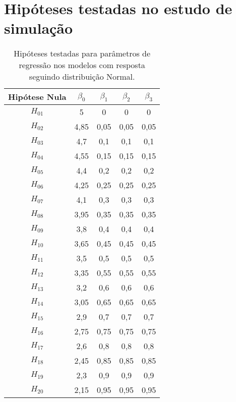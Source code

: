 \chapter{Hipóteses testadas no estudo de simulação}


\begin{table}[H]
\centering
\begin{tabular}{c|cccc}
\hline
Hipótese Nula & $\beta_0$ & $\beta_1$ & $\beta_2$ & $\beta_3$ \\ \hline
$H_{01}$      & 5         & 0         & 0         & 0         \\
$H_{02}$      & 4,85      & 0,05      & 0,05      & 0,05      \\
$H_{03}$      & 4,7       & 0,1       & 0,1       & 0,1       \\
$H_{04}$      & 4,55      & 0,15      & 0,15      & 0,15      \\
$H_{05}$      & 4,4       & 0,2       & 0,2       & 0,2       \\
$H_{06}$      & 4,25      & 0,25      & 0,25      & 0,25      \\
$H_{07}$      & 4,1       & 0,3       & 0,3       & 0,3       \\
$H_{08}$      & 3,95      & 0,35      & 0,35      & 0,35      \\
$H_{09}$      & 3,8       & 0,4       & 0,4       & 0,4       \\
$H_{10}$      & 3,65      & 0,45      & 0,45      & 0,45      \\
$H_{11}$      & 3,5       & 0,5       & 0,5       & 0,5       \\
$H_{12}$      & 3,35      & 0,55      & 0,55      & 0,55      \\
$H_{13}$      & 3,2       & 0,6       & 0,6       & 0,6       \\
$H_{14}$      & 3,05      & 0,65      & 0,65      & 0,65      \\
$H_{15}$      & 2,9       & 0,7       & 0,7       & 0,7       \\
$H_{16}$      & 2,75      & 0,75      & 0,75      & 0,75      \\
$H_{17}$      & 2,6       & 0,8       & 0,8       & 0,8       \\
$H_{18}$      & 2,45      & 0,85      & 0,85      & 0,85      \\
$H_{19}$      & 2,3       & 0,9       & 0,9       & 0,9       \\
$H_{20}$      & 2,15      & 0,95      & 0,95      & 0,95      \\ \hline
\end{tabular}
\caption{Hipóteses testadas para parâmetros de regressão nos modelos com resposta seguindo distribuição Normal.}
\label{tab:hipoteses_beta_normal}
\end{table}

